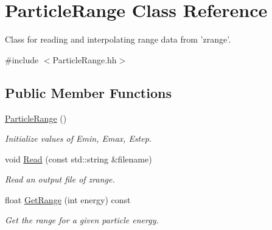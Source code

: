 \hypertarget{class_particle_range}{\section{Particle\-Range Class Reference}
\label{class_particle_range}
}


Class for reading and interpolating range data from 'zrange'.  




{\ttfamily \#include $<$Particle\-Range.\-hh$>$}

\subsection*{Public Member Functions}
\begin{DoxyCompactItemize}
\item 
\hypertarget{class_particle_range_a4273029166d7a6220bfd1728b6c18f69}{\hyperlink{class_particle_range_a4273029166d7a6220bfd1728b6c18f69}{Particle\-Range} ()}\label{class_particle_range_a4273029166d7a6220bfd1728b6c18f69}

\begin{DoxyCompactList}\small\item\em Initialize values of Emin, Emax, Estep. \end{DoxyCompactList}\item 
void \hyperlink{class_particle_range_ac1e0da5aca629369e93caf8e883da624}{Read} (const std\-::string \&filename)
\begin{DoxyCompactList}\small\item\em Read an output file of zrange. \end{DoxyCompactList}\item 
float \hyperlink{class_particle_range_abaa738d09d5ab69162f2443ffba26640}{Get\-Range} (int energy) const 
\begin{DoxyCompactList}\small\item\em Get the range for a given particle energy. \end{DoxyCompactList}\end{DoxyCompactItemize}
